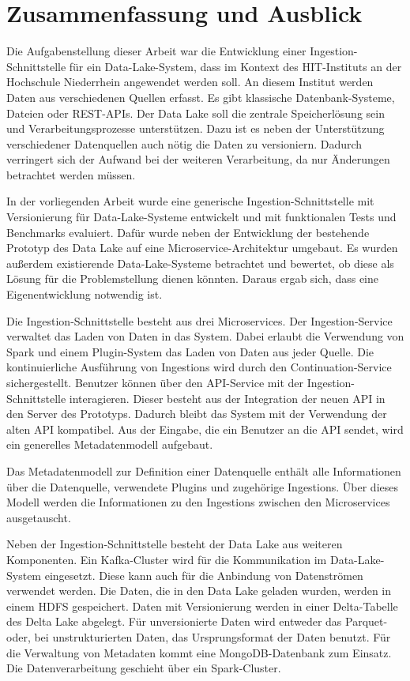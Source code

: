 \chapter{Zusammenfassung und Ausblick}

Die Aufgabenstellung dieser Arbeit war die Entwicklung einer Ingestion-Schnitt\-stelle für ein Data-Lake-System, dass im Kontext des HIT-Instituts an der Hochschule Niederrhein angewendet werden soll.
An diesem Institut werden Daten aus verschiedenen Quellen erfasst.
Es gibt klassische Datenbank-Systeme, Dateien oder REST-APIs.
Der Data Lake soll die zentrale Speicherlösung sein und Verarbeitungsprozesse unterstützen.
Dazu ist es neben der Unterstützung verschiedener Datenquellen auch nötig die Daten zu versioniern.
Dadurch verringert sich der Aufwand bei der weiteren Verarbeitung, da nur Änderungen betrachtet werden müssen.

In der vorliegenden Arbeit wurde eine generische Ingestion-Schnittstelle mit Versionierung für Data-Lake-Systeme entwickelt und mit funktionalen Tests und Benchmarks evaluiert.
Dafür wurde neben der Entwicklung der bestehende Prototyp des Data Lake auf eine Microservice-Archi\-tektur umgebaut.
Es wurden außerdem existierende Data-Lake-Systeme betrachtet und bewertet, ob diese als Lösung für die Problemstellung dienen könnten.
Daraus ergab sich, dass eine Eigenentwicklung notwendig ist.

Die Ingestion-Schnittstelle besteht aus drei Microservices.
Der Ingestion-Ser\-vice verwaltet das Laden von Daten in das System.
Dabei erlaubt die Verwendung von Spark und einem Plugin-System das Laden von Daten aus jeder Quelle.
Die kontinuierliche Ausführung von Ingestions wird durch den Continuation-Service sichergestellt.
Benutzer können über den API-Service mit der Ingestion-Schnittstelle interagieren.
Dieser besteht aus der Integration der neuen API in den Server des Prototyps.
Dadurch bleibt das System mit der Verwendung der alten API kompatibel.
Aus der Eingabe, die ein Benutzer an die API sendet, wird ein generelles Metadatenmodell aufgebaut.

Das Metadatenmodell zur Definition einer Datenquelle enthält alle Informationen über die Datenquelle, verwendete Plugins und zugehörige Ingestions.
Über dieses Modell werden die Informationen zu den Ingestions zwischen den Microservices ausgetauscht.

Neben der Ingestion-Schnittstelle besteht der Data Lake aus weiteren Komponenten.
Ein Kafka-Cluster wird für die Kommunikation im Data-Lake-System eingesetzt.
Diese kann auch für die Anbindung von Datenströmen verwendet werden.
Die Daten, die in den Data Lake geladen wurden, werden in einem HDFS gespeichert.
Daten mit Versionierung werden in einer Delta-Tabelle des Delta Lake abgelegt.
Für unversionierte Daten wird entweder das Parquet- oder, bei unstrukturierten Daten, das Ursprungsformat der Daten benutzt.
Für die Verwaltung von Metadaten kommt eine MongoDB-Datenbank zum Einsatz.
Die Datenverarbeitung geschieht über ein Spark-Cluster.


